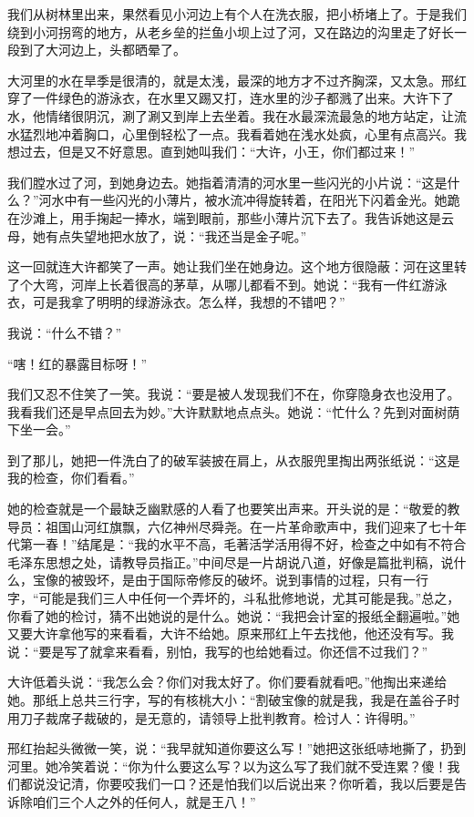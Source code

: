 我们从树林里出来，果然看见小河边上有个人在洗衣服，把小桥堵上了。于是我们绕到小河拐弯的地方，从老乡垒的拦鱼小坝上过了河，又在路边的沟里走了好长一段到了大河边上，头都晒晕了。 

大河里的水在旱季是很清的，就是太浅，最深的地方才不过齐胸深，又太急。邢红穿了一件绿色的游泳衣，在水里又踢又打，连水里的沙子都溅了出来。大许下了水，他情绪很阴沉，涮了涮又到岸上去坐着。我在水最深流最急的地方站定，让流水猛烈地冲着胸口，心里倒轻松了一点。我看着她在浅水处疯，心里有点高兴。我想过去，但是又不好意思。直到她叫我们：“大许，小王，你们都过来！” 

我们膛水过了河，到她身边去。她指着清清的河水里一些闪光的小片说：“这是什么？”河水中有一些闪光的小薄片，被水流冲得旋转着，在阳光下闪着金光。她跪在沙滩上，用手掬起一捧水，端到眼前，那些小薄片沉下去了。我告诉她这是云母，她有点失望地把水放了，说：“我还当是金子呢。” 

这一回就连大许都笑了一声。她让我们坐在她身边。这个地方很隐蔽：河在这里转了个大弯，河岸上长着很高的茅草，从哪儿都看不到。她说：“我有一件红游泳衣，可是我拿了明明的绿游泳衣。怎么样，我想的不错吧？” 

我说：“什么不错？” 

“嗐！红的暴露目标呀！” 

我们又忍不住笑了一笑。我说：“要是被人发现我们不在，你穿隐身衣也没用了。我看我们还是早点回去为妙。”大许默默地点点头。她说：“忙什么？先到对面树荫下坐一会。” 

到了那儿，她把一件洗白了的破军装披在肩上，从衣服兜里掏出两张纸说：“这是我的检查，你们看看。” 

她的检查就是一个最缺乏幽默感的人看了也要笑出声来。开头说的是：“敬爱的教导员：祖国山河红旗飘，六亿神州尽舜尧。在一片革命歌声中，我们迎来了七十年代第一春！”结尾是：“我的水平不高，毛著活学活用得不好，检查之中如有不符合毛泽东思想之处，请教导员指正。”中间尽是一片胡说八道，好像是篇批判稿，说什么，宝像的被毁坏，是由于国际帝修反的破坏。说到事情的过程，只有一行字，“可能是我们三人中任何一个弄坏的，斗私批修地说，尤其可能是我。”总之，你看了她的检讨，猜不出她说的是什么。她说：“我把会计室的报纸全翻遍啦。”她又要大许拿他写的来看看，大许不给她。原来邢红上午去找他，他还没有写。我说：“要是写了就拿来看看，别怕，我写的也给她看过。你还信不过我们？” 

大许低着头说：“我怎么会？你们对我太好了。你们要看就看吧。”他掏出来递给她。那纸上总共三行字，写的有核桃大小：“割破宝像的就是我，我是在盖谷子时用刀子裁席子裁破的，是无意的，请领导上批判教育。检讨人：许得明。” 

邢红抬起头微微一笑，说：“我早就知道你要这么写！”她把这张纸哧地撕了，扔到河里。她冷笑着说：“你为什么要这么写？以为这么写了我们就不受连累？傻！我们都说没记清，你要咬我们一口？还是怕我们以后说出来？你听着，我以后要是告诉除咱们三个人之外的任何人，就是王八！” 

